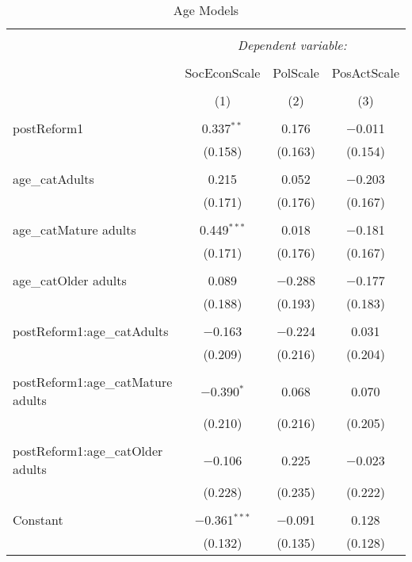 
\begin{table}[!htbp] \centering 
  \caption{Age Models} 
  \label{} 
\begin{tabular}{@{\extracolsep{5pt}}lccc} 
\\[-1.8ex]\hline 
\hline \\[-1.8ex] 
 & \multicolumn{3}{c}{\textit{Dependent variable:}} \\ 
\cline{2-4} 
\\[-1.8ex] & SocEconScale & PolScale & PosActScale \\ 
\\[-1.8ex] & (1) & (2) & (3)\\ 
\hline \\[-1.8ex] 
 postReform1 & 0.337$^{**}$ & 0.176 & $-$0.011 \\ 
  & (0.158) & (0.163) & (0.154) \\ 
  & & & \\ 
 age\_catAdults & 0.215 & 0.052 & $-$0.203 \\ 
  & (0.171) & (0.176) & (0.167) \\ 
  & & & \\ 
 age\_catMature adults & 0.449$^{***}$ & 0.018 & $-$0.181 \\ 
  & (0.171) & (0.176) & (0.167) \\ 
  & & & \\ 
 age\_catOlder adults & 0.089 & $-$0.288 & $-$0.177 \\ 
  & (0.188) & (0.193) & (0.183) \\ 
  & & & \\ 
 postReform1:age\_catAdults & $-$0.163 & $-$0.224 & 0.031 \\ 
  & (0.209) & (0.216) & (0.204) \\ 
  & & & \\ 
 postReform1:age\_catMature adults & $-$0.390$^{*}$ & 0.068 & 0.070 \\ 
  & (0.210) & (0.216) & (0.205) \\ 
  & & & \\ 
 postReform1:age\_catOlder adults & $-$0.106 & 0.225 & $-$0.023 \\ 
  & (0.228) & (0.235) & (0.222) \\ 
  & & & \\ 
 Constant & $-$0.361$^{***}$ & $-$0.091 & 0.128 \\ 
  & (0.132) & (0.135) & (0.128) \\ 

\end{tabular}
\end{table}
